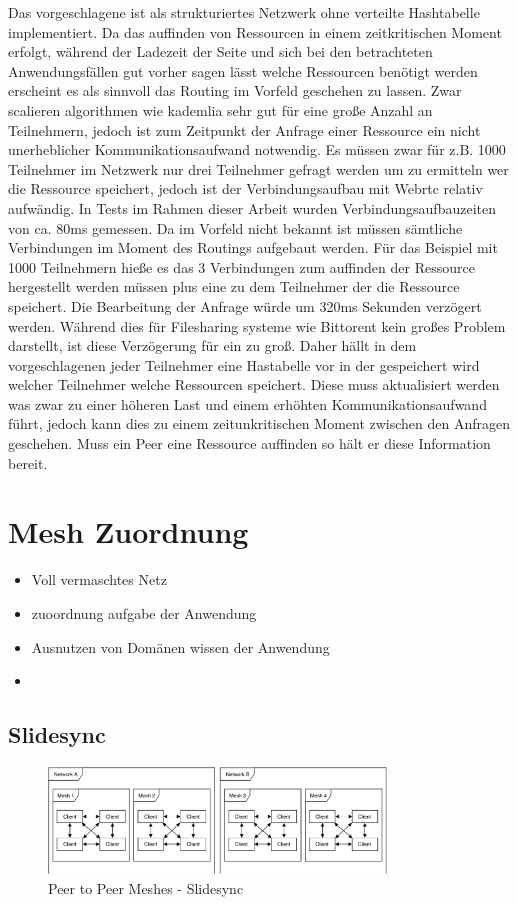 Das vorgeschlagene \pTp \cdn ist als strukturiertes \pTp Netzwerk ohne verteilte Hashtabelle implementiert. Da das auffinden von Ressourcen in einem zeitkritischen Moment erfolgt, während der Ladezeit der Seite und sich bei den betrachteten Anwendungsfällen gut vorher sagen lässt welche Ressourcen benötigt werden erscheint es als sinnvoll das Routing im Vorfeld geschehen zu lassen. Zwar scalieren algorithmen wie kademlia \cite{kademlia} sehr gut für eine große Anzahl an Teilnehmern, jedoch ist zum Zeitpunkt der Anfrage einer Ressource ein nicht unerheblicher Kommunikationsaufwand notwendig. Es müssen zwar für z.B. 1000 Teilnehmer im Netzwerk nur drei Teilnehmer gefragt werden um zu ermitteln wer die Ressource speichert, jedoch ist der Verbindungsaufbau mit Webrtc relativ aufwändig. In Tests im Rahmen dieser Arbeit wurden Verbindungsaufbauzeiten von ca. 80ms gemessen. Da im Vorfeld nicht bekannt ist müssen sämtliche Verbindungen im Moment des Routings aufgebaut werden. Für das Beispiel mit 1000 Teilnehmern hieße es das 3 Verbindungen zum auffinden der Ressource hergestellt werden müssen plus eine zu dem Teilnehmer der die Ressource speichert. Die Bearbeitung der Anfrage würde um 320ms Sekunden verzögert werden. Während dies für Filesharing systeme wie Bittorent kein großes Problem darstellt, ist diese Verzögerung für ein \cdn zu groß. Daher hällt in dem vorgeschlagenen \cdn jeder Teilnehmer eine Hastabelle vor in der gespeichert wird welcher Teilnehmer welche Ressourcen speichert. Diese muss aktualisiert werden was zwar zu einer höheren Last und einem erhöhten Kommunikationsaufwand führt, jedoch kann dies zu einem zeitunkritischen Moment zwischen den Anfragen geschehen. Muss ein Peer eine Ressource auffinden so hält er diese Information bereit. 

\section{Mesh Zuordnung}


\begin{itemize}
	\item Voll vermaschtes Netz
	\item zuoordnung aufgabe der Anwendung
	\item Ausnutzen von Domänen wissen der Anwendung
	\item 
\end{itemize}

\subsection{Slidesync}
\begin{figure}[!h]
	\centering
	\includegraphics[width=0.8\textwidth]{figures/slidesync_peer_meshes}
	\caption[A Figure Short-Title]{Peer to Peer Meshes - Slidesync}
	\label{fig:mesh-slidesync}
\end{figure}


